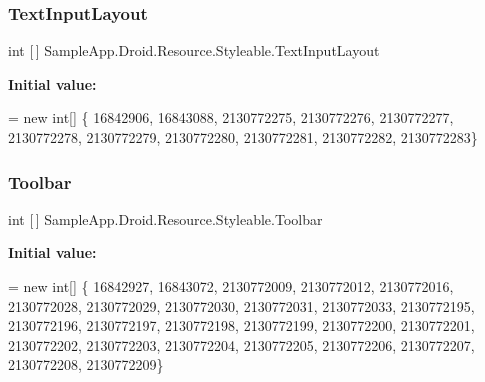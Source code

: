 \subsubsection{\texorpdfstring{Text\+Input\+Layout}{TextInputLayout}}
{\footnotesize\ttfamily int \mbox{[}$\,$\mbox{]} Sample\+App.\+Droid.\+Resource.\+Styleable.\+Text\+Input\+Layout\hspace{0.3cm}{\ttfamily [static]}}

{\bfseries Initial value\+:}
\begin{DoxyCode}
= \textcolor{keyword}{new} \textcolor{keywordtype}{int}[] \{
                    16842906,
                    16843088,
                    2130772275,
                    2130772276,
                    2130772277,
                    2130772278,
                    2130772279,
                    2130772280,
                    2130772281,
                    2130772282,
                    2130772283\}
\end{DoxyCode}
\mbox{\label{class_sample_app_1_1_droid_1_1_resource_1_1_styleable_a2be2189921833334836e1032b0c7c112}} 
\subsubsection{\texorpdfstring{Toolbar}{Toolbar}}
{\footnotesize\ttfamily int \mbox{[}$\,$\mbox{]} Sample\+App.\+Droid.\+Resource.\+Styleable.\+Toolbar\hspace{0.3cm}{\ttfamily [static]}}

{\bfseries Initial value\+:}
\begin{DoxyCode}
= \textcolor{keyword}{new} \textcolor{keywordtype}{int}[] \{
                    16842927,
                    16843072,
                    2130772009,
                    2130772012,
                    2130772016,
                    2130772028,
                    2130772029,
                    2130772030,
                    2130772031,
                    2130772033,
                    2130772195,
                    2130772196,
                    2130772197,
                    2130772198,
                    2130772199,
                    2130772200,
                    2130772201,
                    2130772202,
                    2130772203,
                    2130772204,
                    2130772205,
                    2130772206,
                    2130772207,
                    2130772208,
                    2130772209\}
\end{DoxyCode}
\mbox{\label{class_sample_app_1_1_droid_1_1_resource_1_1_styleable_a5722a0d6531c3e9277e13b563f8bfad2}} 
